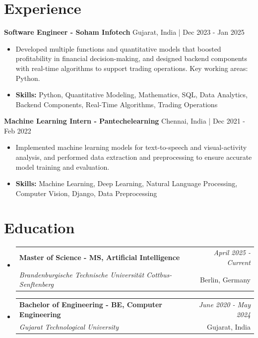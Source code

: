 \documentclass[a4paper,11pt]{article}
\makeatletter
\newcommand{\resumeSubheading}[4]{
\vspace{0.5mm}\item
    \begin{tabular*}{\linewidth}[t]{l@{\extracolsep{\fill}}r}
        \textbf{#1} & \textit{\footnotesize{#4}} \\
        \textit{\footnotesize{#3}} &  \footnotesize{#2}\\
    \end{tabular*}
    \vspace{-2.4mm}
}
\makeatother
\begin{document}
\section{\textbf{Experience}}


\vspace{1mm}
  \textbf{Software Engineer - Soham Infotech} \hfill Gujarat, India | Dec 2023 - Jan 2025
\vspace{-1.5mm} %
\begin{itemize}
  \item Developed multiple functions and quantitative models that boosted profitability in financial decision-making, and designed backend components with real-time algorithms to support trading operations. Key working areas: Python.

\vspace{-2mm}
  \item \textbf{Skills:} Python, Quantitative Modeling, Mathematics, SQL, Data Analytics, Backend Components, Real-Time Algorithms, Trading Operations
\end{itemize}

\vspace{1mm}
  \textbf{Machine Learning Intern - Pantechelearning} \hfill Chennai, India | Dec 2021 - Feb 2022
\vspace{-1.5mm} %
\begin{itemize}
  \item Implemented machine learning models for text-to-speech and visual-activity analysis, and performed data extraction and preprocessing to ensure accurate model training and evaluation.
\vspace{-2mm}
  \item \textbf{Skills:} Machine Learning, Deep Learning, Natural Language Processing, Computer Vision, Django, Data Preprocessing
\end{itemize}\section{\textbf{Education}}
\vspace{-0.4mm}

\begin{itemize}[leftmargin=0.15in, label={}]
\resumeSubheading
{Master of Science - MS, Artificial Intelligence }{Berlin, Germany}
{Brandenburgische Technische Universität Cottbus-Senftenberg  }{April 2025 - Current}

\vspace{1.0mm} %
\resumeSubheading
{Bachelor of Engineering - BE, Computer Engineering  }{Gujarat, India}
{Gujarat Technological University }{June 2020 - May 2024}

\end{itemize}
\end{document}
